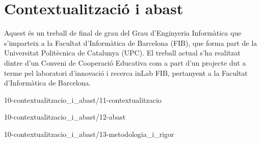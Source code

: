 \chapter{Contextualització i abast}

Aquest és un treball de final de grau del Grau d'Enginyeria Informàtica que s'imparteix a la Facultat d'Informàtica de Barcelona (FIB), que forma part de la Universitat Politècnica de Catalunya (UPC). El treball actual s'ha realitzat dintre d'un Conveni de Cooperació Educativa com a part d'un projecte dut a terme pel laboratori d'innovació i recerca inLab FIB, pertanyent a la Facultat d'Informàtica de Barcelona.

{10-contextualitzacio_i_abast/11-contextualitzacio}

{10-contextualitzacio_i_abast/12-abast}

{10-contextualitzacio_i_abast/13-metodologia_i_rigor}

\begin{comment}
1 Contextualització i abast
1.1 Contextualització 
    1.1.1 Context 
    1.1.2 Problema a resoldre 
    1.1.3 Actors implicats 
    [?] 1.1.4 Justificació
    1.1.5 Lleis i regulacions 
1.2 Abast 
    1.2.1 Objectius 
    1.2.2 Requisits funcionals 
    1.2.3 Requisits no funcionals 
    1.2.4 Obstacles i riscos potencials 
1.3 Metodologia i rigor 
    1.3.1 Metodologia 
    1.3.2 Eines 
\end{comment}